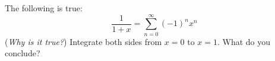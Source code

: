 The following is true:
    $$\frac{1}{1+x} = \sum_{n=0}^\infty (-1)^n x^n$$
(\emph{Why is it true?})  Integrate both sides from $x=0$ to $x=1$.  What do you conclude?
